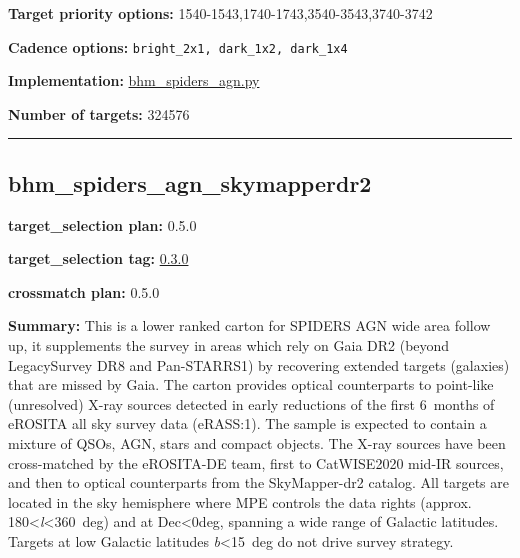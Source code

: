 \noindent\textbf{Target priority options:}
1540-1543,1740-1743,3540-3543,3740-3742

\noindent\textbf{Cadence options:} \texttt{bright\_2x1,\ dark\_1x2,\ dark\_1x4}

\noindent\textbf{Implementation:}
\href{https://github.com/sdss/target_selection/blob/0.3.0/python/target_selection/cartons/bhm_spiders_agn.py}{bhm\_spiders\_agn.py}

\noindent\textbf{Number of targets:} 324576

\begin{center}\rule{0.5\linewidth}{0.5pt}\end{center}

\hypertarget{bhm_spiders_agn_skymapperdr2_plan0.5.0}{%
\subsection{bhm\_spiders\_agn\_skymapperdr2}\label{bhm_spiders_agn_skymapperdr2_plan0.5.0}}

\noindent\textbf{target\_selection plan:} 0.5.0

\noindent\textbf{target\_selection tag:}
\href{https://github.com/sdss/target_selection/tree/0.3.0/}{0.3.0}

\noindent\textbf{crossmatch plan:} 0.5.0

\noindent\textbf{Summary:} This is a lower ranked carton for SPIDERS AGN wide
area follow up, it supplements the survey in areas which rely on Gaia
DR2 (beyond LegacySurvey DR8 and Pan-STARRS1) by recovering extended
targets (galaxies) that are missed by Gaia. The carton provides optical
counterparts to point-like (unresolved) X-ray sources detected in early
reductions of the first 6~months of eROSITA all sky survey data
(eRASS:1). The sample is expected to contain a mixture of QSOs, AGN,
stars and compact objects. The X-ray sources have been cross-matched by
the eROSITA-DE team, first to
CatWISE2020 \citep{Marocco2021}
mid-IR sources, and then to optical counterparts from the
SkyMapper-dr2 \citep{Onken2019}
catalog. All targets are located in the sky hemisphere where MPE
controls the data rights (approx.
180\textless{}\emph{l}\textless360~deg) and at Dec\textless0deg,
spanning a wide range of Galactic latitudes. Targets at low Galactic
latitudes \textbar{}\emph{b}\textbar\textless15~deg do not drive survey
strategy.

